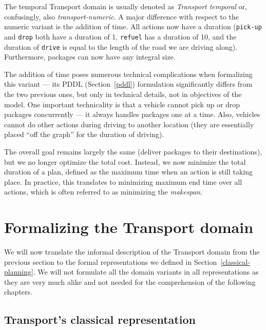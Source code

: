 The temporal Transport domain is usually denoted as \textit{Transport temporal} or, confusingly,
also \textit{transport-numeric}. A major difference with respect to the numeric variant is
the addition of time. All actions now have a duration (\verb+pick-up+ and \verb+drop+ both have a
duration of 1, \verb+refuel+ has a duration of 10, and the duration of \verb+drive+ is
equal to the length of the road we are driving along). Furthermore, packages can now have any integral size.

The addition of time poses numerous technical complications when formalizing this variant
--- its PDDL (Section~\ref{pddl}) formulation significantly differs from the two previous ones, but only in technical details, not in objectives of the model.
One important technicality is that a vehicle cannot pick up or drop packages concurrently --- it always handles packages one at a time. Also, vehicles cannot do other actions during driving to another location (they are essentially placed ``off the graph'' for the duration of driving).

The overall goal remains largely the same (deliver packages to their destinations), but we no longer optimize the total cost. Instead, we now minimize the total duration of a plan,
defined as the maximum time when an action is still taking place.
In practice, this translates to minimizing maximum end time over all actions, which is often referred to as minimizing the \textit{makespan}.



















\section{Formalizing the Transport domain}

We will now translate the informal description of the Transport domain from the previous section to the formal representations we defined in Section~\ref{classical-planning}. We will not formulate all the domain variants in all representations as
they are very much alike and not needed for the comprehension of the following chapters.

\subsection{Transport's classical representation}\label{transport-classical-representation}

